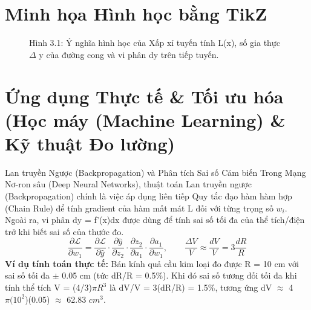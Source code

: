 \documentclass[11pt,a4paper,oneside]{book}
\begin{document}
\section{Minh họa Hình học bằng TikZ}
\begin{figure}[htbp]
\centering
{}
\caption{Hình 3.1: Ý nghĩa hình học của Xấp xỉ tuyến tính L(x), số gia thực $\Delta$ y của đường cong và vi phân dy trên tiếp tuyến.}
\label{fig:tikz-ch3-linear-approx}
\end{figure}

\section{Ứng dụng Thực tế \& Tối ưu hóa (Học máy (Machine Learning) \& Kỹ thuật Đo lường)}
\begin{ungdung}{Lan truyền Ngược (Backpropagation) và Phân tích Sai số Cảm biến}
Trong Mạng Nơ-ron sâu (Deep Neural Networks), thuật toán Lan truyền ngược (Backpropagation) chính là việc áp dụng liên tiếp Quy tắc đạo hàm hàm hợp (Chain Rule) để tính gradient của hàm mất mát L đối với từng trọng số $w_i$. Ngoài ra, vi phân dy = f'(x)dx được dùng để tính sai số tối đa của thể tích/điện trở khi biết sai số của thước đo.
\[ \frac{\partial \mathcal{L}}{\partial w_1} = \frac{\partial \mathcal{L}}{\partial \hat{y}} \cdot \frac{\partial \hat{y}}{\partial z_2} \cdot \frac{\partial z_2}{\partial a_1} \cdot \frac{\partial a_1}{\partial w_1}, \qquad \frac{\Delta V}{V} \approx \frac{dV}{V} = 3\frac{dR}{R} \]
\noindent\textbf{Ví dụ tính toán thực tế:} Bán kính quả cầu kim loại đo được R = 10 cm với sai số tối đa $\pm$ 0.05 cm (tức dR/R = 0.5\%). Khi đó sai số tương đối tối đa khi tính thể tích V = (4/3)$\pi R^3$ là dV/V = 3(dR/R) = 1.5\%, tương ứng dV $\approx$  4$\pi (10^2$)(0.05) $\approx$  62.83 $cm^3$.
\end{ungdung}
\end{document}
